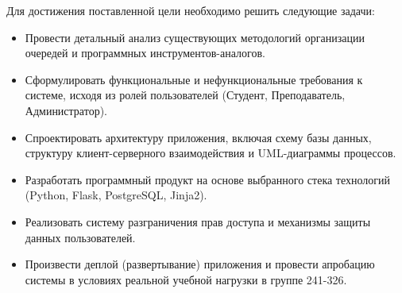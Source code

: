 Для достижения поставленной цели необходимо решить следующие задачи:
\begin{itemize}
	\item Провести детальный анализ существующих методологий организации очередей и программных инструментов-аналогов.
	\item Сформулировать функциональные и нефункциональные требования к системе,
     исходя из ролей пользователей (Студент, Преподаватель, Администратор).
	\item Спроектировать архитектуру приложения, включая схему базы данных, 
    структуру клиент-серверного взаимодействия и UML-диаграммы процессов.
	\item Разработать программный продукт на основе выбранного стека технологий (Python, Flask, PostgreSQL, Jinja2).
	\item Реализовать систему разграничения прав доступа и механизмы защиты данных пользователей.
	\item Произвести деплой (развертывание) приложения и провести апробацию 
    системы в условиях реальной учебной нагрузки в группе 241-326.
\end{itemize}